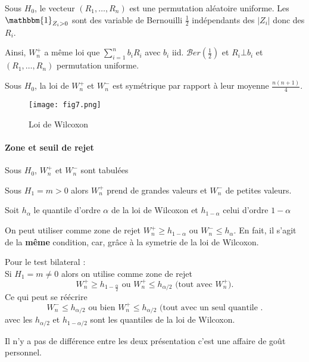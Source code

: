\documentclass{article}
\theoremstyle{plain}%
\theoremstyle{definition}
\theoremstyle{remark}
\begin{document}
Sous $ H_0 $, le vecteur $ (R_1, \dots, R_n) $ est une permutation aléatoire uniforme. Les $ \mathbbm{1}_{Z_i > 0} $ sont des variable de Bernouilli $ \frac{1}{2} $ indépendants des $ \left| Z_i \right| $ donc des $ R_i $. 

Ainsi, $ W_n^+ $ a même loi que $ \sum_{i=1}^{n}b_i R_i $ avec $ b_i $ iid. $ \mathcal{B}er(\frac{1}{2}) $ et $ R_i \bot b_i  $ et $ (R_1, \dots, R_n) $ permutation uniforme.

Sous $ H_0 $, la loi de $ W_n^+ $ et $ W_n^- $ est symétrique par rapport à leur moyenne $ \frac{n(n+1)}{4} $. 

\begin{figure}[!htbp]
    \centering
    \caption{Loi de Wilcoxon}
    \texttt{[image: fig7.png]}
\end{figure}

\paragraph*{Zone et seuil de rejet}
Sous $ H_0 $, $ W_n^+ $ et $ W_n^- $ sont tabulées

Sous $ H_1 = m > 0 $ alors $ W_n^+ $ prend de grandes valeurs et $ W_n^- $ de petites valeurs.

Soit $ h_\alpha  $ le quantile d'ordre $ \alpha  $ de la loi de Wilcoxon et $ h_{1 - \alpha } $ celui d'ordre $ 1 - \alpha  $ 

On peut utiliser comme zone de rejet $ W_n^+ \geq h_{1 - \alpha }$ ou $ W_n^- \leq  h_\alpha  $. En fait, il s'agit de la \textbf{même} condition, car, grâce à la symetrie de la loi de Wilcoxon.

Pour le test bilateral : \\
Si $ H_1 = m \neq 0 $ alors on utilise comme zone de rejet 
\[
    W_n^+ \geq h_{1 - \frac{\alpha}{2}} \text{ ou } W_n^+ \leq h_{\alpha /2} \text{ (tout avec } W_n^+ \text{)}
.\]
Ce qui peut se réécrire 
\[
    W_n^- \leq h_{\alpha /2} \text{ ou bien } W_n^+ \leq h_{\alpha /2} \text{ (tout avec un seul quantile }
.\]
avec les $ h_{\alpha /2} $ et $ h_{1-\alpha /2} $ sont les quantiles de la loi de Wilcoxon.

Il n'y a pas de différence entre les deux présentation c'est une affaire de goût personnel. 
\end{document}
